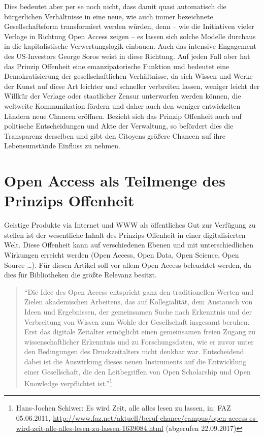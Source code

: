 \documentclass[a4paper,
fontsize=11pt,
oneside,
numbers=noperiodatend,
parskip=half-,
bibliography=totoc,
final
]{scrartcl}
\begin{document}
Dies bedeutet aber per se noch nicht, dass damit quasi automatisch die
bürgerlichen Verhältnisse in eine neue, wie auch immer bezeichnete
Gesellschaftsform transformiert werden würden, denn -- wie die
Initiativen vieler Verlage in Richtung Open Access zeigen -- es lassen
sich solche Modelle durchaus in die kapitalistische Verwertungslogik
einbauen. Auch das intensive Engagement des US-Investors George Soros
weist in diese Richtung. Auf jeden Fall aber hat das Prinzip Offenheit
eine emanzipatorische Funktion und bedeutet eine Demokratisierung der
gesellschaftlichen Verhältnisse, da sich Wissen und Werke der Kunst auf
diese Art leichter und schneller verbreiten lassen, weniger leicht der
Willkür der Verlage oder staatlicher Zensur unterworfen werden können,
die weltweite Kommunikation fördern und daher auch den weniger
entwickelten Ländern neue Chancen eröffnen. Bezieht sich das Prinzip
Offenheit auch auf politische Entscheidungen und Akte der Verwaltung, so
befördert dies die Transparenz derselben und gibt den Citoyens größere
Chancen auf ihre Lebensumstände Einfluss zu nehmen.

\hypertarget{open-access-als-teilmenge-des-prinzips-offenheit}{%
\section*{Open Access als Teilmenge des Prinzips
Offenheit}\label{open-access-als-teilmenge-des-prinzips-offenheit}}

Geistige Produkte via Internet und WWW als öffentliches Gut zur
Verfügung zu stellen ist der wesentliche Inhalt des Prinzips Offenheit
in einer digitalisierten Welt. Diese Offenheit kann auf verschiedenen
Ebenen und mit unterschiedlichen Wirkungen erreicht werden (Open Access,
Open Data, Open Science, Open Source \ldots{}). Für diesen Artikel soll
vor allem Open Access beleuchtet werden, da dies für Bibliotheken die
größte Relevanz besitzt.

\begin{quote}
\enquote{Die Idee des Open Access entspricht ganz den traditionellen
Werten und Zielen akademischen Arbeitens, das auf Kollegialität, dem
Austausch von Ideen und Ergebnissen, der gemeinsamen Suche nach
Erkenntnis und der Verbreitung von Wissen zum Wohle der Gesellschaft
insgesamt beruhen. Erst das digitale Zeitalter ermöglicht einen
gemeinsamen freien Zugang zu wissenschaftlicher Erkenntnis und zu
Forschungsdaten, wie er zuvor unter den Bedingungen des Druckzeitalters
nicht denkbar war. Entscheidend dabei ist die Auswirkung dieses neuen
Instruments auf die Entwicklung einer Gesellschaft, die den
Leitbegriffen von Open Scholarship und Open Knowledge verpflichtet
ist.}\footnote{Hans-Jochen Schiwer: Es wird Zeit, alle alles lesen zu
  lassen, in: FAZ 05.06.2011,
  \url{http://www.faz.net/aktuell/beruf-chance/campus/open-access-es-wird-zeit-alle-alles-lesen-zu-lassen-1639084.html}
  (abgerufen 22.09.2017)}
\end{quote}
\end{document}
